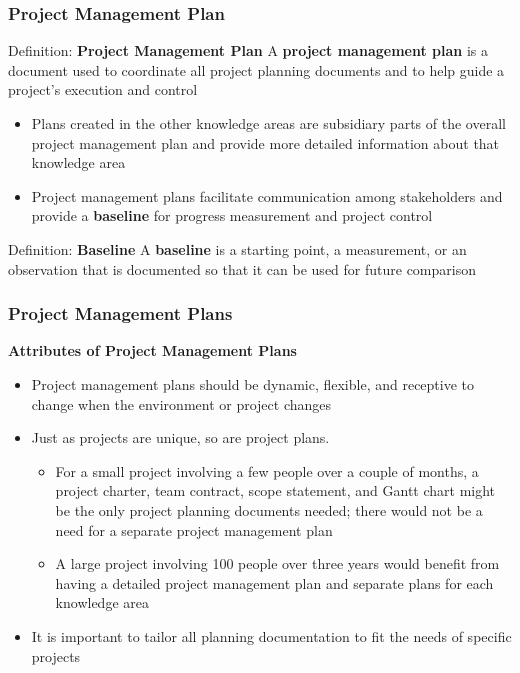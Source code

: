 \documentclass{beamer}
\begin{document}
\begin{frame}
\frametitle{Project Management Plan}
\begin{block}{Definition: \textbf{Project Management Plan}}
A \textbf{project management plan} is a document used to coordinate all project planning documents and to help guide a project's execution and control
\end{block}

\begin{itemize}
\item Plans created in the other knowledge areas are subsidiary parts of the overall project management plan and provide more detailed information about that knowledge area
\item Project management plans facilitate communication among stakeholders and provide a \textbf{baseline} for progress measurement and project control
\end{itemize}

\begin{block}{Definition: \textbf{Baseline}}
A \textbf{baseline} is a starting point, a measurement, or an observation that is documented so that it can be used for future comparison
\end{block}
\end{frame}

\begin{frame}
\frametitle{Project Management Plans}
\textbf{Attributes of Project Management Plans}\\
\vspace{0.5cm}
\begin{itemize}
\item Project management plans should be dynamic, flexible, and receptive to change when the environment or project changes
\item Just as projects are unique, so are project plans.
\begin{itemize}
\item For a small project involving a few people over a couple of months, a project charter, team contract, scope statement, and Gantt chart might be the only project planning documents needed; there would not be a need for a separate project management plan
\item A large project involving 100 people over three years would benefit from having a detailed project management plan and separate plans for each knowledge area
\end{itemize}
\item It is important to tailor all planning documentation to fit the needs of specific projects
\end{itemize}
\end{frame}
\end{document}
